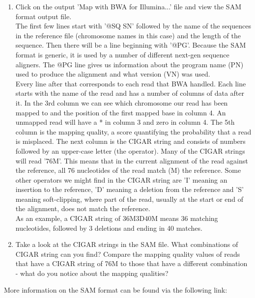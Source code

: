 \documentclass[12pt,a4paper]{article}
\begin{document}
\begin{enumerate}
  \item Click on the output 'Map with BWA for Illumina...' file and view the
SAM format output file. \\

  The first few lines start with '@SQ SN' followed by the name of the
  sequences in the reference file (chromosome names in this case) and
  the length of the sequence. Then there will be a line beginning with
  '@PG'. Because the SAM format is generic, it is used by a number of
  different next-gen sequence aligners. The @PG line gives us
  information about the program name (PN) used to produce the
  alignment and what version (VN) was used.\\

  Every line after that corresponds to each read that BWA
  handled. Each line starts with the name of the read and has a number
  of columns of data after it. In the 3rd column we can see which
  chromosome our read has been mapped to and the position of the first
  mapped base in column 4. An unmapped read will have a * in column 3
  and zero in column 4. The 5th column is the mapping quality, a score
  quantifying the probability that a read is misplaced. The next
  column is the CIGAR string and consists of numbers followed by an
  upper-case letter (the operator). Many of the CIGAR strings will
  read '76M'. This means that in the current alignment of the read
  against the reference, all 76 nucleotides of the read match (M) the
  reference. Some other operators we might find in the CIGAR string
  are 'I' meaning an insertion to the reference, 'D' meaning a
  deletion from the reference and 'S' meaning soft-clipping, where
  part of the read, usually at the start or end of the alignment, does
  not match the reference. \\

  As an example, a CIGAR string of 36M3D40M means 36 matching
  nucleotides, followed by 3 deletions and ending in 40 matches.  \\

  \item Take a look at the CIGAR strings in the SAM file. What
    combinations of CIGAR string can you find? Compare the mapping
    quality values of reads that have a CIGAR string of 76M to those
    that have a different combination - what do you notice about the
    mapping qualities?  \\
\end{enumerate}
More information on the SAM format can be found via the following
link: \\
\end{document}
